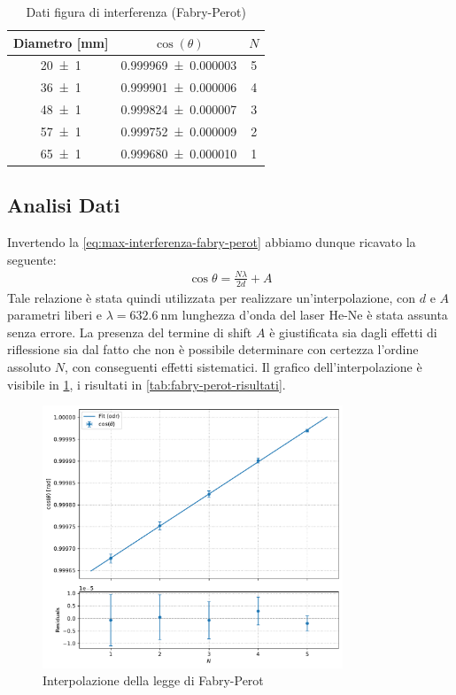 \documentclass[a4paper]{article}
\begin{document}
\begin{table}[htbp]
\centering
\caption{Dati figura di interferenza (Fabry-Perot)}
\begin{tabular}{ccc}
\toprule
Diametro [\si{\milli\meter}] & $\cos(\theta)$ & $N$ \\
\midrule
\num{20 \pm 1} & \num{0.999969 \pm 0.000003}  & 5 \\
\num{36 \pm 1} & \num{0.999901 \pm 0.000006}  & 4 \\
\num{48 \pm 1} & \num{0.999824 \pm 0.000007}  & 3 \\
\num{57 \pm 1} & \num{0.999752 \pm 0.000009}  & 2 \\
\num{65 \pm 1} & \num{0.999680 \pm 0.000010}  & 1 \\
\bottomrule
\end{tabular}
\label{tab:fabry-perot-dati}
\end{table}


\subsection{Analisi Dati}
Invertendo la \cref{eq:max-interferenza-fabry-perot} abbiamo dunque ricavato la seguente:
\begin{align}
    \cos \theta = \frac{N\lambda}{2d} + A
\end{align}
Tale relazione è stata quindi utilizzata per realizzare un'interpolazione,
con $d$ e $A$ parametri liberi e $\lambda=\SI{632.6}{\nano\meter}$ lunghezza d'onda del laser He-Ne è stata assunta senza errore. La presenza del termine di shift $A$ è giustificata sia dagli effetti di riflessione sia dal fatto che non è possibile determinare con certezza l'ordine assoluto $N$, con conseguenti effetti sistematici.
Il grafico dell'interpolazione è visibile in \cref{fig:fabry-perot-interpolazione}, i risultati in \cref{tab:fabry-perot-risultati}.

\begin{figure}[htbp]
\centering
\includegraphics[width=0.8\textwidth]{./grafici/fabry_perot_interferenza.pdf}
\caption{Interpolazione della legge di Fabry-Perot}
\label{fig:fabry-perot-interpolazione}
\end{figure}
\end{document}
